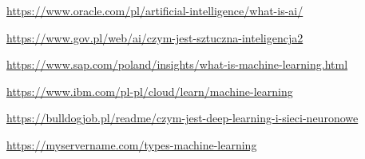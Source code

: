 \documentclass{article}
\begin{document}
\begin{boxlabel}
\item  \url{https://www.oracle.com/pl/artificial-intelligence/what-is-ai/}
\item  \url{https://www.gov.pl/web/ai/czym-jest-sztuczna-inteligencja2}
\item  \url{https://www.sap.com/poland/insights/what-is-machine-learning.html}
\item  \url{https://www.ibm.com/pl-pl/cloud/learn/machine-learning}
\item  \url{https://bulldogjob.pl/readme/czym-jest-deep-learning-i-sieci-neuronowe}
\item  \url{https://myservername.com/types-machine-learning}
\end{boxlabel}
\end{document}
